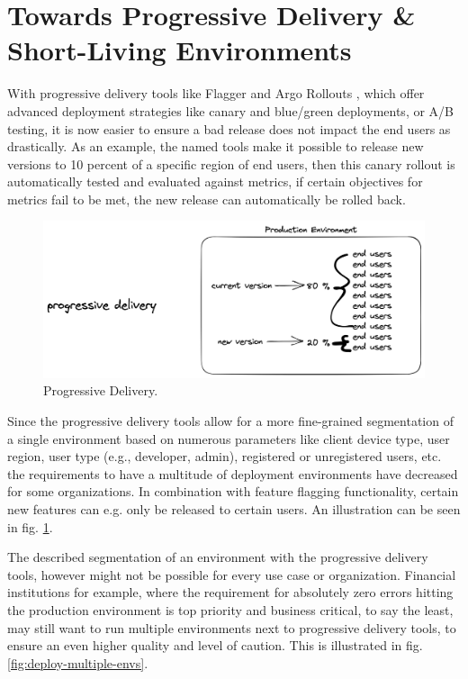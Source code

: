 \section{Towards Progressive Delivery \& Short-Living Environments}

With progressive delivery tools like
Flagger
\autocite{flaggerWebsite}
and
Argo Rollouts
\autocite{argoRolloutsWebsite},
which offer advanced deployment strategies
like canary and blue/green deployments, or A/B testing,
it is now easier to ensure a bad release does not impact the end users
as drastically.
As an example, the named tools make it possible to release new versions
to 10 percent of a specific region of end users,
then this canary rollout is automatically tested and evaluated against metrics,
if certain objectives for metrics fail to be met,
the new release can automatically be rolled back.

\begin{figure}[h]
	\centering
	\includegraphics[width=1.00\linewidth]{assets/progressive-delivery.png}
	\caption{Progressive Delivery.
	}
	\label{fig:progressive-delivery}	
\end{figure}

Since the progressive delivery tools allow for a more
fine-grained segmentation
of a single environment based on numerous parameters like
client device type, user region, user type (e.g., developer, admin),
registered or unregistered users, etc.
the requirements to have a multitude of deployment environments
have decreased for some organizations.
In combination with feature flagging functionality,
certain new features can e.g. only be released to certain users.
An illustration can be seen in fig. \ref{fig:progressive-delivery}.

The described segmentation of an environment with the progressive delivery
tools, however might not be possible for every use case or organization.
Financial institutions for example, where the requirement for absolutely zero
errors hitting the production environment is top priority and business critical,
to say the least,
may still want to run multiple environments next to progressive delivery tools,
to ensure an even higher quality and level of caution.
This is illustrated in fig. \ref{fig:deploy-multiple-envs}.

